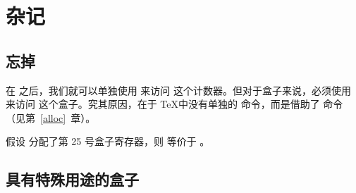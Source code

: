 \documentclass{book}
\begin{document}
\section{杂记}

\subsection{忘掉 }

在  之后，我们就可以单独使用  来访问  这个计数器。但对于盒子来说，必须使用  来访问  这个盒子。究其原因，在于 \TeX 中没有单独的  命令，而是借助了  命令（见第~\ref{alloc}~章）。

\begin{example}
假设 \textup{} 分配了第 25 号盒子寄存器，则 \textup{ }等价于 \textup{}。
\end{example}

\subsection{具有特殊用途的盒子}
\end{document}
